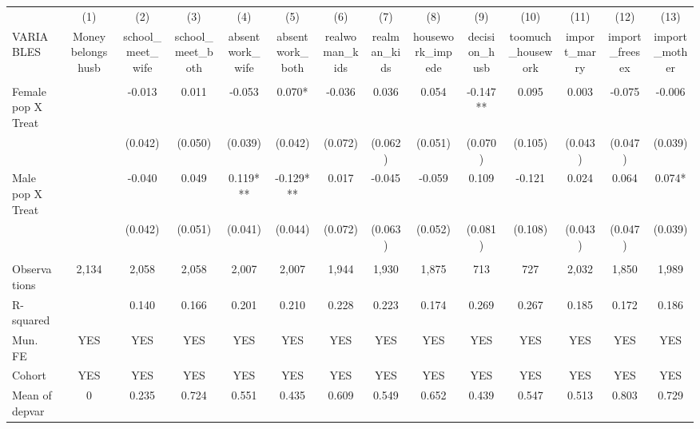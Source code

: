 \begin{tabular}{lccccccccccccc} \hline
 & (1) & (2) & (3) & (4) & (5) & (6) & (7) & (8) & (9) & (10) & (11) & (12) & (13) \\
VARIABLES & Money belongs husb & school\_meet\_wife & school\_meet\_both & absentwork\_wife & absentwork\_both & realwoman\_kids & realman\_kids & housework\_impede & decision\_husb & toomuch\_housework & import\_marry & import\_freesex & import\_mother \\ \hline
 &  &  &  &  &  &  &  &  &  &  &  &  &  \\
Female pop X Treat &  & -0.013 & 0.011 & -0.053 & 0.070* & -0.036 & 0.036 & 0.054 & -0.147** & 0.095 & 0.003 & -0.075 & -0.006 \\
 &  & (0.042) & (0.050) & (0.039) & (0.042) & (0.072) & (0.062) & (0.051) & (0.070) & (0.105) & (0.043) & (0.047) & (0.039) \\
Male pop X Treat &  & -0.040 & 0.049 & 0.119*** & -0.129*** & 0.017 & -0.045 & -0.059 & 0.109 & -0.121 & 0.024 & 0.064 & 0.074* \\
 &  & (0.042) & (0.051) & (0.041) & (0.044) & (0.072) & (0.063) & (0.052) & (0.081) & (0.108) & (0.043) & (0.047) & (0.039) \\
 &  &  &  &  &  &  &  &  &  &  &  &  &  \\
Observations & 2,134 & 2,058 & 2,058 & 2,007 & 2,007 & 1,944 & 1,930 & 1,875 & 713 & 727 & 2,032 & 1,850 & 1,989 \\
R-squared &  & 0.140 & 0.166 & 0.201 & 0.210 & 0.228 & 0.223 & 0.174 & 0.269 & 0.267 & 0.185 & 0.172 & 0.186 \\
Mun. FE & YES & YES & YES & YES & YES & YES & YES & YES & YES & YES & YES & YES & YES \\
Cohort & YES & YES & YES & YES & YES & YES & YES & YES & YES & YES & YES & YES & YES \\
 Mean of depvar & 0 & 0.235 & 0.724 & 0.551 & 0.435 & 0.609 & 0.549 & 0.652 & 0.439 & 0.547 & 0.513 & 0.803 & 0.729 \\ \hline
\end{tabular}
